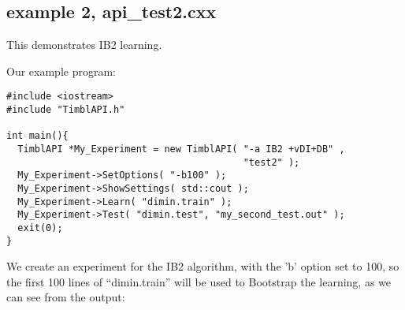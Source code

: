 \subsection{example 2, api\_test2.cxx}
This demonstrates IB2 learning.

Our example program:

\begin{verbatim}
#include <iostream>
#include "TimblAPI.h"

int main(){
  TimblAPI *My_Experiment = new TimblAPI( "-a IB2 +vDI+DB" , 
                                          "test2" );
  My_Experiment->SetOptions( "-b100" );
  My_Experiment->ShowSettings( std::cout );
  My_Experiment->Learn( "dimin.train" );  
  My_Experiment->Test( "dimin.test", "my_second_test.out" );  
  exit(0);
}
\end{verbatim}

We create an experiment for the IB2 algorithm, with the 'b' option set
to 100, so the first 100 lines of ``dimin.train'' will be used to
Bootstrap the learning, as we can see from the output:

